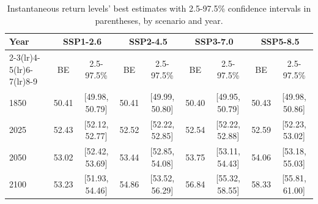 \begin{table}[htbp]
\centering
\begin{tabular}{lcccccccc}
\toprule
Year & \multicolumn{2}{c}{\textbf{SSP1-2.6}} & \multicolumn{2}{c}{\textbf{SSP2-4.5}} & \multicolumn{2}{c}{\textbf{SSP3-7.0}} & \multicolumn{2}{c}{\textbf{SSP5-8.5}} \\
\cmidrule(lr){2-3}\cmidrule(lr){4-5}\cmidrule(lr){6-7}\cmidrule(lr){8-9}
 & BE & 2.5-97.5\% & BE & 2.5-97.5\% & BE & 2.5-97.5\% & BE & 2.5-97.5\% \\
\midrule
1850 & 50.41 & [49.98, 50.79] & 50.41 & [49.99, 50.80] & 50.40 & [49.95, 50.79] & 50.43 & [49.98, 50.86] \\
2025 & 52.43 & [52.12, 52.77] & 52.52 & [52.22, 52.85] & 52.54 & [52.22, 52.88] & 52.59 & [52.23, 53.02] \\
2050 & 53.02 & [52.42, 53.69] & 53.44 & [52.85, 54.08] & 53.75 & [53.11, 54.43] & 54.06 & [53.18, 55.03] \\
2100 & 53.23 & [51.93, 54.46] & 54.86 & [53.52, 56.29] & 56.84 & [55.32, 58.55] & 58.33 & [55.81, 61.00] \\
\bottomrule
\end{tabular}
\caption{Instantaneous return levels' best estimates with 2.5-97.5\% confidence intervals in parentheses, by scenario and year.}
\label{tab:scenarios}
\end{table}